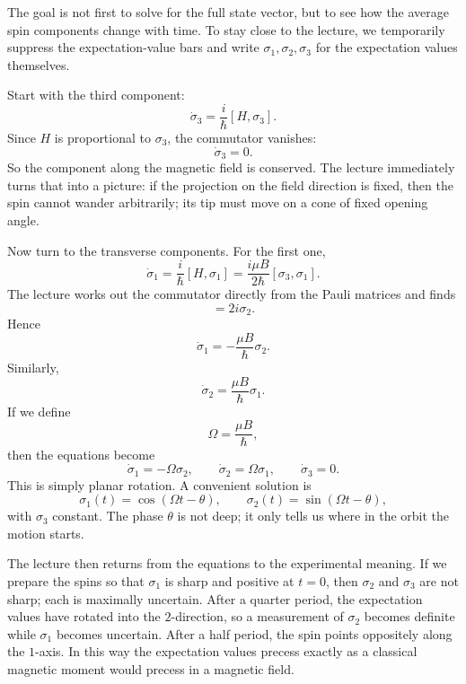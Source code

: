 The goal is not first to solve for the full state vector, but to see how the average spin components change with time. To stay close to the lecture, we temporarily suppress the expectation-value bars and write \(\sigma_1,\sigma_2,\sigma_3\) for the expectation values themselves.

Start with the third component:
\begin{equation}
\dot\sigma_3=\frac{i}{\hbar}[H,\sigma_3].
\end{equation}
Since \(H\) is proportional to \(\sigma_3\), the commutator vanishes:
\begin{equation}
\dot\sigma_3=0.
\end{equation}
So the component along the magnetic field is conserved. The lecture immediately turns that into a picture: if the projection on the field direction is fixed, then the spin cannot wander arbitrarily; its tip must move on a cone of fixed opening angle.

Now turn to the transverse components. For the first one,
\begin{equation}
\dot\sigma_1=\frac{i}{\hbar}[H,\sigma_1]
=
\frac{i\mu B}{2\hbar}[\sigma_3,\sigma_1].
\end{equation}
The lecture works out the commutator directly from the Pauli matrices and finds
\begin{equation}
[\sigma_3,\sigma_1]=2i\sigma_2.
\end{equation}
Hence
\begin{equation}
\dot\sigma_1=-\frac{\mu B}{\hbar}\sigma_2.
\end{equation}
Similarly,
\begin{equation}
\dot\sigma_2=\frac{\mu B}{\hbar}\sigma_1.
\end{equation}
If we define
\begin{equation}
\Omega=\frac{\mu B}{\hbar},
\end{equation}
then the equations become
\begin{equation}
\dot\sigma_1=-\Omega\sigma_2,
\qquad
\dot\sigma_2=\Omega\sigma_1,
\qquad
\dot\sigma_3=0.
\end{equation}
This is simply planar rotation. A convenient solution is
\begin{equation}
\sigma_1(t)=\cos(\Omega t-\theta),
\qquad
\sigma_2(t)=\sin(\Omega t-\theta),
\end{equation}
with \(\sigma_3\) constant. The phase \(\theta\) is not deep; it only tells us where in the orbit the motion starts.

The lecture then returns from the equations to the experimental meaning. If we prepare the spins so that \(\sigma_1\) is sharp and positive at \(t=0\), then \(\sigma_2\) and \(\sigma_3\) are not sharp; each is maximally uncertain. After a quarter period, the expectation values have rotated into the \(2\)-direction, so a measurement of \(\sigma_2\) becomes definite while \(\sigma_1\) becomes uncertain. After a half period, the spin points oppositely along the \(1\)-axis. In this way the expectation values precess exactly as a classical magnetic moment would precess in a magnetic field.

